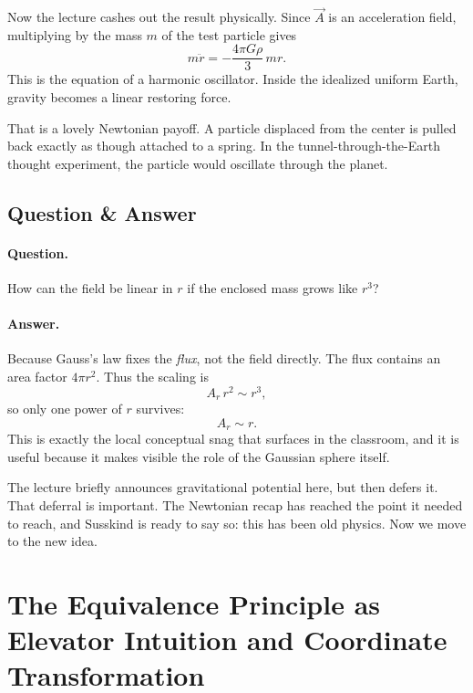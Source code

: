 Now the lecture cashes out the result physically. Since $\vec A$ is an acceleration field, multiplying by the mass $m$ of the test particle gives
\begin{equation}
m\ddot r = -\frac{4\pi G\rho}{3}\,mr.
\end{equation}
This is the equation of a harmonic oscillator. Inside the idealized uniform Earth, gravity becomes a linear restoring force.

That is a lovely Newtonian payoff. A particle displaced from the center is pulled back exactly as though attached to a spring. In the tunnel-through-the-Earth thought experiment, the particle would oscillate through the planet.

\subsection{Question \& Answer}

\paragraph{Question.} How can the field be linear in $r$ if the enclosed mass grows like $r^3$?

\paragraph{Answer.} Because Gauss's law fixes the \emph{flux}, not the field directly. The flux contains an area factor $4\pi r^2$. Thus the scaling is
\begin{equation}
A_r \, r^2 \sim r^3,
\end{equation}
so only one power of $r$ survives:
\begin{equation}
A_r \sim r.
\end{equation}
This is exactly the local conceptual snag that surfaces in the classroom, and it is useful because it makes visible the role of the Gaussian sphere itself.

The lecture briefly announces gravitational potential here, but then defers it. That deferral is important. The Newtonian recap has reached the point it needed to reach, and Susskind is ready to say so: this has been old physics. Now we move to the new idea.

\section{The Equivalence Principle as Elevator Intuition and Coordinate Transformation}

